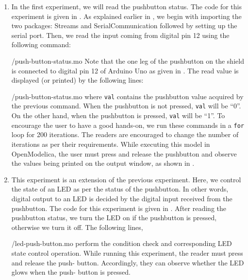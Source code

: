\begin{enumerate}
\item In the first experiment, we will read the pushbutton status. The code for this experiment is given in
  . As explained earlier in , 
  we begin with importing the two packages: Streams and SerialCommunication followed 
  by setting up the serial port. Then, we read the input coming
 from digital pin 12 using the following command: 
 
  {\LocPushOpenModelicacode/push-button-status.mo}
  Note that the one leg of the pushbutton on the shield is connected to digital
pin 12 of Arduino Uno as given in . The read value is displayed (or
printed) by the following lines:

  {\LocPushOpenModelicacode/push-button-status.mo} where {\tt val} contains the pushbutton value acquired by the previous command.
  When the pushbutton is not pressed, {\tt val} will be ``0''. On the other hand,
  when the pushbutton is pressed, {\tt val} will be ``1''. To encourage the user to have a good hands-on, we run these commands in a
{\tt for} loop for 200 iterations. The readers are encouraged to change the number
of iterations as per their requirements. While executing this model in OpenModelica, 
the user must press and release the pushbutton and observe the values being printed
on the output window, as shown in .
\item This experiment is an extension of the previous
  experiment. Here, we control the state of an LED as per the status
  of the pushbutton. In other words, digital output to an LED is
  decided by the digital input received from the pushbutton. The code
  for this experiment is given in . 
  After reading the pushbutton status, we turn the LED on if the pushbutton is
  pressed, otherwise we turn it off. The following lines, 
  
  {\LocPushOpenModelicacode/led-push-button.mo} perform the condition check
  and corresponding LED state control operation. While running this experiment, the reader must press and release the push-
  button. Accordingly, they can observe whether the LED glows when the push-
  button is pressed.
\end{enumerate}



